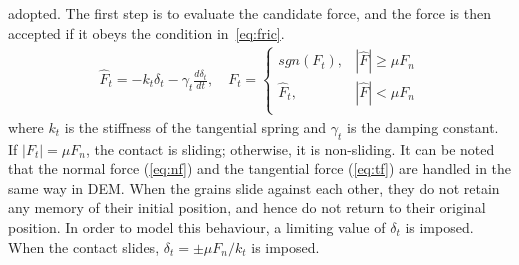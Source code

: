 adopted. The first step is to evaluate the candidate force, and the force is 
then accepted if it obeys the condition in~\cref{eq:fric}.
%
\begin{align}
 {\hat{F}_{t}}=-{{k}_{t}}{{\delta}_{t}}-{{\gamma}_{t}}\frac{d{{\delta}_{t}}}{dt},
  \quad F_{t}=
\begin{cases}
sgn(F_{t}), & {\left|\hat{F}\right|} \ge \mu F_{n} \\
{\hat{F}}_{t}, & {\left|\hat{F}\right|} < \mu F_{n} \\
\end{cases}
\label{eq:tf}
\end{align} 
%
where $k_{t}$ is the stiffness of the tangential spring and $\gamma_{t}$ is the 
damping constant. If $|F_{t}|=\mu F_{n}$, the contact is sliding; otherwise, it 
is non-sliding. It can be noted that the normal force (\cref{eq:nf}) and the 
tangential force (\cref{eq:tf}) are handled in the same way in DEM. When the 
grains slide against each other, they do not retain any memory 
of their initial position, and hence do not return to their original position. 
In order to model this behaviour, a limiting value of $\delta_{t}$ is imposed. 
When the contact slides, $\delta_{t}=\pm\mu F_{n}/k_{t}$ is imposed.

